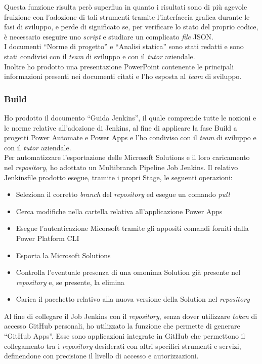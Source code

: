 Questa funzione risulta però superflua in quanto i risultati sono di più agevole fruizione con l'adozione di tali strumenti tramite l'interfaccia grafica durante le fasi di sviluppo, e perde di significato se, per verificare lo stato del proprio codice, è necessario eseguire uno \emph{script} e studiare un complicato \emph{file} JSON.\\ 
I documenti “Norme di progetto” e “Analisi statica” sono stati redatti e sono stati condivisi con il \emph{team} di sviluppo e con il \emph{tutor} aziendale.\\  
Inoltre ho prodotto una presentazione PowerPoint contenente le principali informazioni presenti nei documenti citati e l'ho esposta al \emph{team} di sviluppo. 

\subsubsection*{Build}
Ho prodotto il documento “Guida Jenkins”, il quale comprende tutte le nozioni e le norme relative all'adozione di Jenkins, al fine di applicare la fase Build a progetti Power Automate e Power Apps e l'ho condiviso con il \emph{team} di sviluppo e con il \emph{tutor} aziendale.\\  
Per automatizzare l'esportazione delle Microsoft Solutions e il loro caricamento nel \emph{repository}, ho adottato un Multibranch Pipeline Job Jenkins. Il relativo Jenkinsfile prodotto esegue, tramite i propri Stage, le seguenti operazioni:
\begin{itemize}
    \item Seleziona il corretto \emph{branch} del \emph{repository} ed esegue un comando \emph{pull}
    \item Cerca modifiche nella cartella relativa all'applicazione Power Apps
    \item Esegue l'autenticazione Micorsoft tramite gli appositi comandi forniti dalla Power Platform CLI
    \item Esporta la Microsoft Solutions
    \item Controlla l'eventuale presenza di una omonima Solution già presente nel \emph{repository} e, se presente, la elimina 
    \item Carica il pacchetto relativo alla nuova versione della Solution nel \emph{repository}\\
\end{itemize}
Al fine di collegare il Job Jenkins con il \emph{repository}, senza dover utilizzare \emph{token} di accesso GitHub personali, ho utilizzato la funzione che permette di generare “GitHub Apps”. Esse sono applicazioni integrate in GitHub che permettono il collegamento tra i \emph{repository} desiderati con altri specifici strumenti e servizi, definendone con precisione il livello di accesso e autorizzazioni.  

